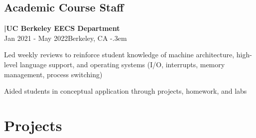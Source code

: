 \documentclass{article}
\let\olditemize=\itemize \let\endolditemize=\enditemize
\renewenvironment{itemize}{\olditemize[topsep=0em] \itemsep-.3em}{\endolditemize}
\newcommand{\entry}[3]{\quad\textbf{|\quad#1}\\#2\qquad#3}
\begin{document}
\subsection{Academic Course Staff}
\entry{UC Berkeley EECS Department}{Jan 2021 - May 2022}{Berkeley, CA}
\begin{itemize}
  \item Led weekly reviews to reinforce student knowledge of machine architecture, high-level language support, and operating systems (I/O, interrupts, memory management, process switching)
  \item Aided students in conceptual application through projects, homework, and labs
\end{itemize}


%
%

\section{Projects}
\end{document}

